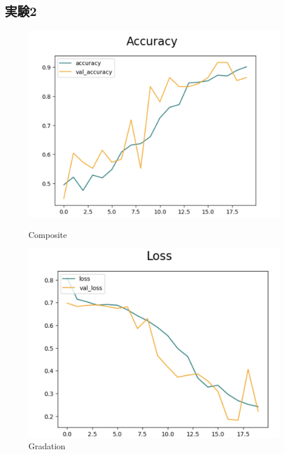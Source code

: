 \documentclass[a4paper, 11pt, titlepage]{jsarticle}
\begin{document}
\subsection{実験2}
\begin{figure}[htbp]
  \begin{minipage}[b]{0.45\linewidth}
    \centering
    \includegraphics[keepaspectratio, scale=0.33]{ex2_acc.png}
    \caption{Composite}
  \end{minipage}
  \begin{minipage}[b]{0.45\linewidth}
    \centering
    \includegraphics[keepaspectratio, scale=0.33]{ex2_loss.png}
    \caption{Gradation}
  \end{minipage}
\end{figure}
\end{document}
